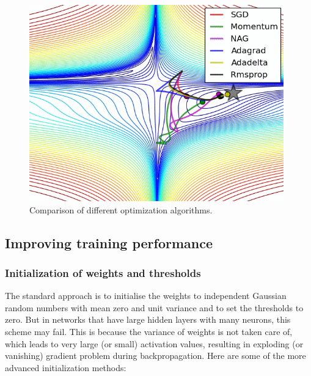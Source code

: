 	\vspace{4mm}
\begin{figure}[htb]
	\begin{center}
		\includegraphics*[width=11cm, keepaspectratio]{obr/opt.png}
	\end{center}
	\vspace{4mm}
	\caption{Comparison of different optimization algorithms. \cite{groman}} 
	\label{algorithms}
\end{figure}

\newpage
\subsection{Improving training performance}
\subsubsection{Initialization of weights and thresholds}

The standard approach is to initialise the weights to independent Gaussian random numbers with mean zero and unit variance and to set the thresholds to zero. But in networks that have large hidden layers with many neurons, this scheme may fail. This is because the variance of weights is not taken care of, which leads to very large (or small) activation values, resulting in exploding (or vanishing) gradient problem during backpropagation. \cite{mehlig} Here are some of the more advanced initialization methods:

